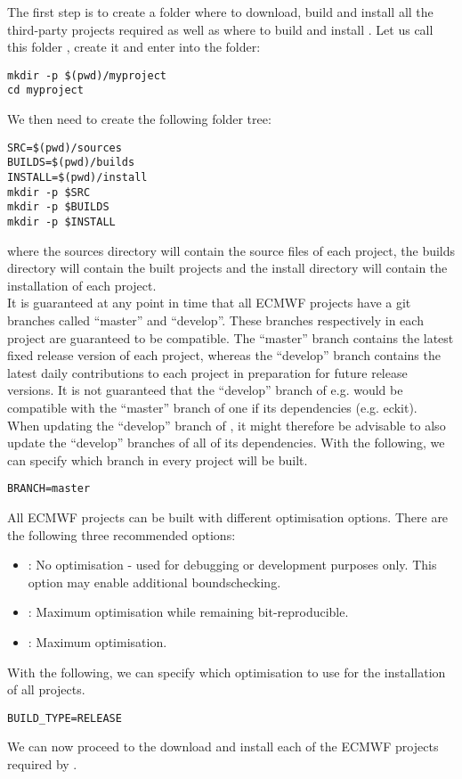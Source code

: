 The first step is to create a folder where to download, build 
and install all the third-party projects required as well as 
where to build and install \Atlas. Let us call this folder 
, create it and enter into the folder:
%
\begin{lstlisting}[style=BashStyle]
mkdir -p $(pwd)/myproject
cd myproject
\end{lstlisting}
%
We then need to create the following folder tree:
%
\begin{lstlisting}[style=BashStyle]
SRC=$(pwd)/sources
BUILDS=$(pwd)/builds
INSTALL=$(pwd)/install
mkdir -p $SRC 
mkdir -p $BUILDS 
mkdir -p $INSTALL
\end{lstlisting}
%
where the sources directory will contain the source files
of each project, the builds directory will contain the 
built projects and the install directory will contain 
the installation of each project.\\
%
It is guaranteed at any point in time that all ECMWF projects have
a git branches called ``master'' and ``develop''. These branches
respectively in each project are guaranteed to be compatible. The
``master'' branch contains the latest fixed release version of each
project, whereas the ``develop'' branch contains the latest daily
contributions to each project in preparation for future release
versions. It is not guaranteed that the ``develop'' branch of e.g.
\Atlas would be compatible with the ``master'' branch of one if its
dependencies (e.g. eckit).\\
When updating the ``develop'' branch of \Atlas, it might therefore
be advisable to also update the ``develop'' branches of all of its
dependencies.
With the following, we can specify which branch in every project
will be built.
\begin{lstlisting}[style=BashStyle]
BRANCH=master
\end{lstlisting}
%
All ECMWF projects can be built with different optimisation options.
There are the following 
three recommended options:\\
\begin{itemize}
\setlength\itemsep{0.1em}
\item {}: No optimisation - used for debugging or development
                     purposes only. This option may enable additional
                     boundschecking.
\item {}: Maximum optimisation while remaining bit-reproducible.
\item {}: Maximum optimisation.
\end{itemize}
With the following, we can specify which optimisation to use for the
installation of all projects.
\begin{lstlisting}[style=BashStyle]
BUILD_TYPE=RELEASE
\end{lstlisting}
%
We can now proceed to the download and install
each of the ECMWF projects required by \Atlas.
%
